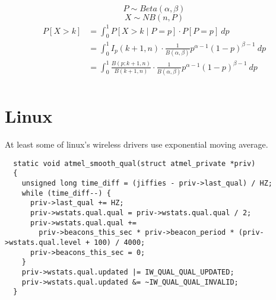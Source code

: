 \documentclass[10pt,a4paper]{article}
\begin{document}
\begin{equation*}
  P \sim Beta(\alpha, \beta)
\end{equation*}
\begin{equation*}
  X \sim NB(n, P)
\end{equation*}
\begin{align*}
  P[X > k] & = \int_{0}^{1} P[X > k \mid P = p] \cdot P[P = p]\ dp\\
           & = \int_{0}^{1} I_{p}(k + 1, n) \cdot \frac{1}{B(\alpha, \beta)} p^{\alpha - 1}(1 - p)^{\beta - 1}\ dp\\
           & = \int_{0}^{1} \frac{B(p; k + 1, n)}{B(k + 1, n)} \cdot \frac{1}{B(\alpha, \beta)} p^{\alpha - 1}(1 - p)^{\beta - 1}\ dp\\
\end{align*}

\section{Linux}

At least some of linux's wireless drivers use exponential moving average.

\begin{verbatim}
  static void atmel_smooth_qual(struct atmel_private *priv)
  {
    unsigned long time_diff = (jiffies - priv->last_qual) / HZ;
    while (time_diff--) {
      priv->last_qual += HZ;
      priv->wstats.qual.qual = priv->wstats.qual.qual / 2;
      priv->wstats.qual.qual +=
        priv->beacons_this_sec * priv->beacon_period * (priv->wstats.qual.level + 100) / 4000;
      priv->beacons_this_sec = 0;
    }
    priv->wstats.qual.updated |= IW_QUAL_QUAL_UPDATED;
    priv->wstats.qual.updated &= ~IW_QUAL_QUAL_INVALID;
  }
\end{verbatim}
\end{document}
